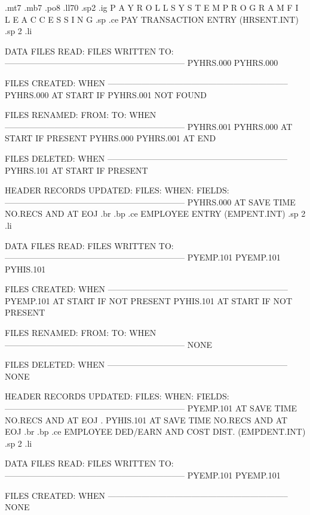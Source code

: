 .mt7
.mb7
.po8
.ll70
.sp2
.ig
P A Y R O L L	      S Y S T E M
P R O G R A M	      F I L E	     A C C E S S I N G
.sp
.ce
PAY TRANSACTION ENTRY (HRSENT.INT)
.sp 2
.li

DATA FILES READ:		   FILES WRITTEN TO:
-----------------------------------------------------------------
       PYHRS.000			PYHRS.000


FILES CREATED:			  WHEN
-----------------------------------------------------------------
       PYHRS.000	      AT START IF PYHRS.001 NOT FOUND


FILES RENAMED:
  FROM:        TO:		  WHEN
-----------------------------------------------------------------
 PYHRS.001  PYHRS.000	      AT START IF PRESENT
 PYHRS.000  PYHRS.001	      AT END


FILES DELETED:			  WHEN
-----------------------------------------------------------------
       PYHRS.101	      AT START IF PRESENT


HEADER RECORDS UPDATED:
FILES:		 WHEN:		    FIELDS:
-----------------------------------------------------------------
 PYHRS.000	AT SAVE TIME	   NO.RECS%
		AND AT EOJ
.br
.bp
.ce
EMPLOYEE ENTRY (EMPENT.INT)
.sp 2
.li

DATA FILES READ:		   FILES WRITTEN TO:
-----------------------------------------------------------------
       PYEMP.101			PYEMP.101
					PYHIS.101

FILES CREATED:			  WHEN
-----------------------------------------------------------------
       PYEMP.101	      AT START IF NOT PRESENT
       PYHIS.101	      AT START IF NOT PRESENT


FILES RENAMED:
  FROM:        TO:		  WHEN
-----------------------------------------------------------------
     NONE


FILES DELETED:			  WHEN
-----------------------------------------------------------------
     NONE


HEADER RECORDS UPDATED:
FILES:		 WHEN:		    FIELDS:
-----------------------------------------------------------------
 PYEMP.101	AT SAVE TIME	   NO.RECS%
		AND AT EOJ	   .
 PYHIS.101	AT SAVE TIME	   NO.RECS%
		AND AT EOJ
.br
.bp
.ce
EMPLOYEE DED/EARN AND COST DIST. (EMPDENT.INT)
.sp 2
.li

DATA FILES READ:		   FILES WRITTEN TO:
-----------------------------------------------------------------
       PYEMP.101			PYEMP.101

FILES CREATED:			  WHEN
-----------------------------------------------------------------
       NONE


